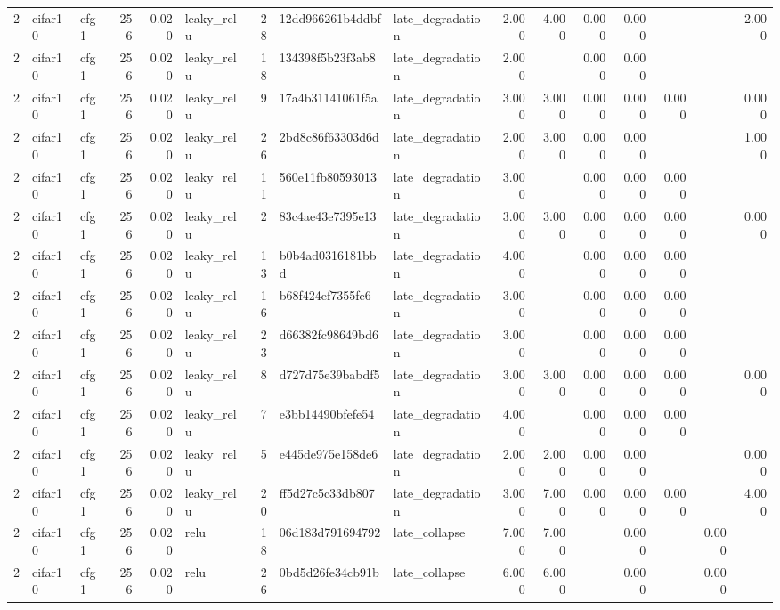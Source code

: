 \begin{table}[htbp]
{\begin{tabular}{@{}rllrrlrllrrrrrrr@{}}
2 & cifar10 & cfg1 & 256 & 0.020 & leaky\_relu & 28 & 12dd966261b4ddbf & late\_degradation & 2.000 & 4.000 & 0.000 & 0.000 &  &  & 2.000 \\
2 & cifar10 & cfg1 & 256 & 0.020 & leaky\_relu & 18 & 134398f5b23f3ab8 & late\_degradation & 2.000 &  & 0.000 & 0.000 &  &  &  \\
2 & cifar10 & cfg1 & 256 & 0.020 & leaky\_relu & 9 & 17a4b31141061f5a & late\_degradation & 3.000 & 3.000 & 0.000 & 0.000 & 0.000 &  & 0.000 \\
2 & cifar10 & cfg1 & 256 & 0.020 & leaky\_relu & 26 & 2bd8c86f63303d6d & late\_degradation & 2.000 & 3.000 & 0.000 & 0.000 &  &  & 1.000 \\
2 & cifar10 & cfg1 & 256 & 0.020 & leaky\_relu & 11 & 560e11fb80593013 & late\_degradation & 3.000 &  & 0.000 & 0.000 & 0.000 &  &  \\
2 & cifar10 & cfg1 & 256 & 0.020 & leaky\_relu & 2 & 83c4ae43e7395e13 & late\_degradation & 3.000 & 3.000 & 0.000 & 0.000 & 0.000 &  & 0.000 \\
2 & cifar10 & cfg1 & 256 & 0.020 & leaky\_relu & 13 & b0b4ad0316181bbd & late\_degradation & 4.000 &  & 0.000 & 0.000 & 0.000 &  &  \\
2 & cifar10 & cfg1 & 256 & 0.020 & leaky\_relu & 16 & b68f424ef7355fe6 & late\_degradation & 3.000 &  & 0.000 & 0.000 & 0.000 &  &  \\
2 & cifar10 & cfg1 & 256 & 0.020 & leaky\_relu & 23 & d66382fc98649bd6 & late\_degradation & 3.000 &  & 0.000 & 0.000 & 0.000 &  &  \\
2 & cifar10 & cfg1 & 256 & 0.020 & leaky\_relu & 8 & d727d75e39babdf5 & late\_degradation & 3.000 & 3.000 & 0.000 & 0.000 & 0.000 &  & 0.000 \\
2 & cifar10 & cfg1 & 256 & 0.020 & leaky\_relu & 7 & e3bb14490bfefe54 & late\_degradation & 4.000 &  & 0.000 & 0.000 & 0.000 &  &  \\
2 & cifar10 & cfg1 & 256 & 0.020 & leaky\_relu & 5 & e445de975e158de6 & late\_degradation & 2.000 & 2.000 & 0.000 & 0.000 &  &  & 0.000 \\
2 & cifar10 & cfg1 & 256 & 0.020 & leaky\_relu & 20 & ff5d27c5c33db807 & late\_degradation & 3.000 & 7.000 & 0.000 & 0.000 & 0.000 &  & 4.000 \\
2 & cifar10 & cfg1 & 256 & 0.020 & relu & 18 & 06d183d791694792 & late\_collapse & 7.000 & 7.000 &  & 0.000 &  & 0.000 &  \\
2 & cifar10 & cfg1 & 256 & 0.020 & relu & 26 & 0bd5d26fe34cb91b & late\_collapse & 6.000 & 6.000 &  & 0.000 &  & 0.000 &  \\

\end{tabular}}
\end{table}

